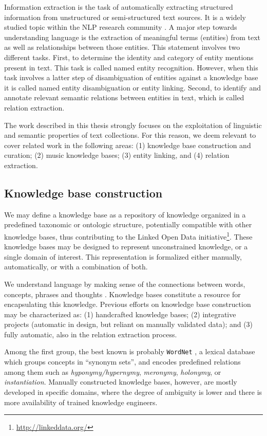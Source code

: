 Information extraction is the task of automatically extracting structured information from unstructured or semi-structured text sources. It is a widely studied topic within the NLP research community \citep{cowie1996information}.
A major step towards understanding language is the extraction of meaningful terms (entities) from text as well as relationships between those entities. This statement involves two different tasks. First, to determine the identity and category of entity mentions present in text. This task is called named entity recognition. However, when this task involves a latter step of disambiguation of entities against a knowledge base it is called named entity disambiguation or entity linking. Second, to identify and annotate relevant semantic relations between entities in text, which is called relation extraction.

The work described in this thesis strongly focuses on the exploitation of linguistic and semantic properties of text collections. For this reason, we deem relevant to cover related work in the following areas: (1) knowledge base construction and curation; (2) music knowledge bases; (3) entity linking, and (4) relation extraction.


\subsection{Knowledge base construction}
\label{sec:SOA:nlu:kbs}

We may define a knowledge base as a repository of knowledge organized in a predefined taxonomic or ontologic structure, potentially compatible with other knowledge bases, thus contributing to the Linked Open Data initiative\footnote{\url{http://linkeddata.org/}}. These knowledge bases may be designed to represent unconstrained knowledge, or a single domain of interest. This representation is formalized either manually, automatically, or with a combination of both.

We understand language by making sense of the connections between words, concepts, phrases and thoughts \citep{Havasietal2007}. Knowledge bases constitute a resource for encapsulating this knowledge. Previous efforts on knowledge base construction may be characterized as: (1) handcrafted knowledge bases; (2) integrative projects (automatic in design, but reliant on manually validated data); and (3) fully automatic, also in the relation extraction process.

Among the first group, the best known is probably \texttt{WordNet} \citep{Miller1995}, a lexical database which groups concepts in ``synonym sets'', and encodes predefined relations among them such as \textit{hyponymy/hypernymy}, \textit{meronymy}, \textit{holonymy}, or \textit{instantiation}. Manually constructed knowledge bases, however, are mostly developed in specific domains, where the degree of ambiguity is lower and there is more availability of trained knowledge engineers.

